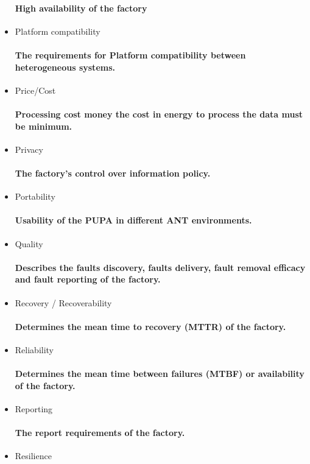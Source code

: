 \begin{itemize}
  \paragraph{High availability of the factory}
  \item Platform compatibility
  \paragraph{The requirements for Platform compatibility between heterogeneous systems.}
  \item Price/Cost
  \paragraph{Processing cost money the cost in energy to process the data must be minimum.}
  \item Privacy
  \paragraph{The factory's control over information policy.}
  \item Portability
  \paragraph{Usability of the PUPA in different ANT environments.}
  \item Quality 
  \paragraph{Describes the faults discovery, faults delivery, fault removal efficacy and fault reporting of the factory.}
  \item Recovery / Recoverability
  \paragraph{Determines the mean time to recovery (MTTR) of the factory.}
  \item Reliability
  \paragraph{Determines the mean time between failures (MTBF) or availability of the factory.}
  \item Reporting
  \paragraph{The report requirements of the factory.}
  \item Resilience

\end{itemize}
